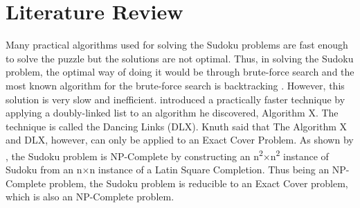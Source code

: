 \documentclass[a4paper,oneside,11pt]{report}
\begin{document}
\chapter{Literature Review}
Many practical algorithms used for solving the Sudoku problems are fast enough to solve the puzzle but the solutions are not optimal. Thus, in solving the Sudoku problem, the optimal way of doing it would be through brute-force search and the most known algorithm for the brute-force search is backtracking \cite{Cazenave}. However, this solution is very slow and inefficient. \cite{Knuth} introduced a practically faster technique by applying a doubly-linked list to an algorithm he discovered, Algorithm X. The technique is called the Dancing Links (DLX). Knuth said that The Algorithm X and DLX, however, can only be applied to an Exact Cover Problem. As shown by \cite{Yato}, the Sudoku problem is NP-Complete by constructing an n\textsuperscript{2}$\times$n\textsuperscript{2} instance of Sudoku from an n$\times$n instance of a Latin Square Completion. Thus being an NP-Complete problem, the Sudoku problem is reducible to an Exact Cover problem, which is also an NP-Complete problem.\\
\end{document}
